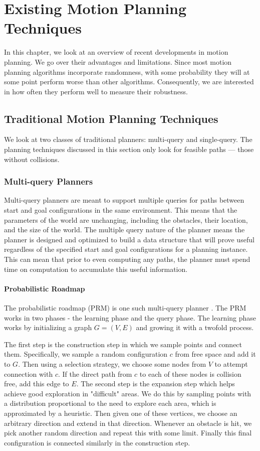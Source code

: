 \chapter{Existing Motion Planning Techniques} \label{chap:traditional_techniques}
In this chapter, we look at an overview of recent developments in motion planning. We go over their advantages and limitations. Since most motion planning algorithms incorporate randomness, with some probability they will at some point perform worse than other algorithms. Consequently, we are interested in how often they perform well to measure their robustness.

\section{Traditional Motion Planning Techniques} \label{planning:techniques}
We look at two classes of traditional planners: multi-query and single-query. The planning techniques discussed in this section only look for feasible paths --- those without collisions.

\subsection{Multi-query Planners}
Multi-query planners are meant to support multiple queries for paths between start and goal configurations in the same environment. This means that the parameters of the world are unchanging, including the obstacles, their location, and the size of the world. The multiple query nature of the planner means the planner is designed and optimized to build a data structure that will prove useful regardless of the specified start and goal configurations for a planning instance. This can mean that prior to even computing any paths, the planner must spend time on computation to accumulate this useful information.

\subsubsection{Probabilistic Roadmap}
The probabilistic roadmap (PRM) is one such multi-query planner \cite{kavraki:prm}. The PRM works in two phases - the learning phase and the query phase. The learning phase works by initializing a graph $G=(V,E)$ and growing it with a twofold process. 

The first step is the construction step in which we sample points and connect them. Specifically, we sample a random configuration $c$ from free space and add it to $G$. Then using a selection strategy, we choose some nodes from $V$ to attempt connection with $c$. If the direct path from $c$ to each of these nodes is collision free, add this edge to $E$. The second step is the expansion step which helps achieve good exploration in "difficult" areas. We do this by sampling points with a distribution proportional to the need to explore each area, which is approximated by a heuristic. Then given one of these vertices, we choose an arbitrary direction and extend in that direction. Whenever an obstacle is hit, we pick another random direction and repeat this with some limit. Finally this final configuration is connected similarly in the construction step. 


